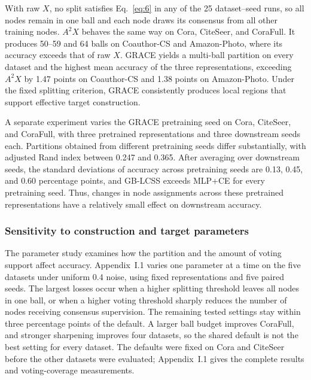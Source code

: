 \documentclass[10pt,letterpaper,nopreprintline]{elsarticle}
\theoremstyle{plain}
\begin{document}


With raw \(X\), no split satisfies Eq.~\eqref{eq:6} in any of the 25 dataset--seed runs, so all nodes remain in one ball and each node draws its consensus from all other training nodes. \(A^2X\) behaves the same way on Cora, CiteSeer, and CoraFull. It produces 50--59 and 64 balls on Coauthor-CS and Amazon-Photo, where its accuracy exceeds that of raw \(X\). GRACE yields a multi-ball partition on every dataset and the highest mean accuracy of the three representations, exceeding \(A^2X\) by 1.47 points on Coauthor-CS and 1.38 points on Amazon-Photo. Under the fixed splitting criterion, GRACE consistently produces local regions that support effective target construction.

A separate experiment varies the GRACE pretraining seed on Cora, CiteSeer, and CoraFull, with three pretrained representations and three downstream seeds each. Partitions obtained from different pretraining seeds differ substantially, with adjusted Rand index \cite{ref74} between 0.247 and 0.365. After averaging over downstream seeds, the standard deviations of accuracy across pretraining seeds are 0.13, 0.45, and 0.60 percentage points, and GB-LCSS exceeds MLP+CE for every pretraining seed. Thus, changes in node assignments across these pretrained representations have a relatively small effect on downstream accuracy.

\subsubsection{Sensitivity to construction and target parameters}\label{sec:4.3.4}

The parameter study examines how the partition and the amount of voting support affect accuracy. Appendix~I.1 varies one parameter at a time on the five datasets under uniform 0.4 noise, using fixed representations and five paired seeds. The largest losses occur when a higher splitting threshold leaves all nodes in one ball, or when a higher voting threshold sharply reduces the number of nodes receiving consensus supervision. The remaining tested settings stay within three percentage points of the default. A larger ball budget improves CoraFull, and stronger sharpening improves four datasets, so the shared default is not the best setting for every dataset. The defaults were fixed on Cora and CiteSeer before the other datasets were evaluated; Appendix~I.1 gives the complete results and voting-coverage measurements.
\end{document}
